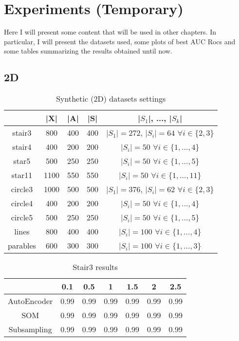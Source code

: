 \chapter{Experiments (Temporary)}
Here I will present some content that will be used in other chapters. In particular, I will present the datasets used, some plots of best AUC Rocs and some tables summarizing the results obtained until now.

\section{2D}

\begin{table}[h]
    \centering
    \def\arraystretch{1.5}
    \begin{tabular}{|| c | c | c | c | c ||}
    \hline
         & |X| & |A| & |S| & |$S_1$|, ..., |$S_k$|  \\
    \hline \hline
    stair3 & 800 & 400 & 400 & $|S_1| = 272$, $|S_i| = 64$ $\forall i \in \{2, 3\}$ \\
    \hline
    stair4 & 400 & 200 & 200 & $|S_i| = 50$ $\forall i \in \{1, ..., 4\}$ \\
    \hline
    star5 & 500 & 250 & 250 & $|S_i| = 50$ $\forall i \in \{1, ..., 5\}$ \\
    \hline
    star11 & 1100 & 550 & 550 & $|S_i| = 50$ $\forall i \in \{1, ..., 11\}$ \\
    \hline
    circle3 & 1000 & 500 & 500 & $|S_1| = 376$, $|S_i| = 62$ $\forall i \in \{2, 3\}$ \\
    \hline
    circle4 & 400 & 200 & 200 & $|S_i| = 50$ $\forall i \in \{1, ..., 4\}$ \\
    \hline
    circle5 & 500 & 250 & 250 & $|S_i| = 50$ $\forall i \in \{1, ..., 5\}$ \\
    \hline
    lines & 800 & 400 & 400 & $|S_i| = 100$ $\forall i \in \{1, ..., 4\}$ \\
    \hline
    parables & 600 & 300 & 300 & $|S_i| = 100$ $\forall i \in \{1, ..., 3\}$ \\
    \hline
    \end{tabular}
    \caption{Synthetic (2D) datasets settings}
    \label{tab:syn_2d_ds_settings}
\end{table}

\begin{table}[h]
    \centering
    \def\arraystretch{1.5}
    \begin{tabular}{|| c | c | c | c | c | c | c ||}
    \hline
         & 0.1 & 0.5 & 1 & 1.5 & 2 & 2.5  \\
    \hline \hline
    AutoEncoder & 0.99 & 0.99 & 0.99 & 0.99 & 0.99 & 0.99 \\ \hline
    SOM & 0.99 & 0.99 & 0.99 & 0.99 & 0.99 & 0.99 \\ \hline
    Subsampling & 0.99 & 0.99 & 0.99 & 0.99 & 0.99 & 0.99 \\ \hline
    \end{tabular}
    \caption{Stair3 results}
    \label{tab:stair3_res}
\end{table}

